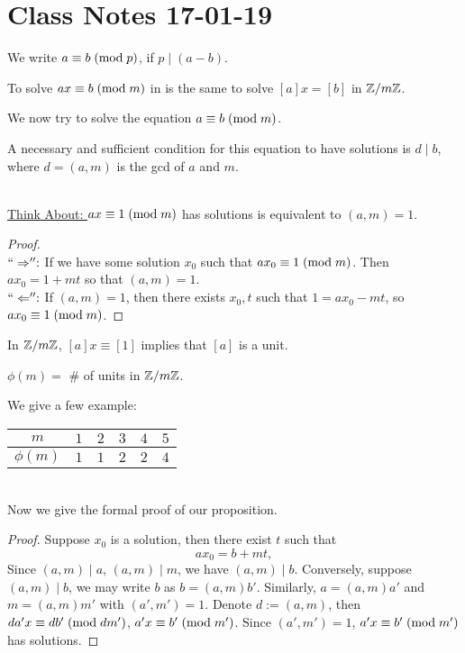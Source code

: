 \section{Class Notes 17-01-19}
\begin{definition}
We write $a\equiv b\;(\mbox{mod}{\;p})$, if $p\mid (a-b)$.
\end{definition}
\begin{remark}
To solve $ax\equiv b\;(\mbox{mod}{\;m})$ in \Z{} is the same to solve $[a]x=[b]$ in $\mathbb{Z}/m\mathbb{Z}$.
\end{remark}
We now try to solve the equation $a\equiv b\;(\mbox{mod}{\;m})$.
\begin{proposition}
A necessary and sufficient condition for this equation to have solutions is $d\mid b$, where $d=(a,m)$ is the gcd of $a$ and $m$.
\end{proposition}
\mbox{}\\\underline{Think About: }
$ax\equiv 1\;(\mbox{mod}{\;m})$ has solutions is equivalent to $(a,m) = 1$.
\begin{proof}\mbox{}\\
$``\Rightarrow'':$ If we have some solution $x_0$ such that $ax_0\equiv 1\;(\mbox{mod}{\;m})$. Then $ax_0=1+mt$ so that $(a,m)= 1$.\\
$``\Leftarrow'': $ If $(a,m) = 1$, then there exists $x_0, t$ such that $1=ax_0-mt$, so $ax_0\equiv 1\;(\mbox{mod}{\;m})$.
\end{proof}
\begin{remark}
In $\mathbb{Z}/m\mathbb{Z}$, $[a]x\equiv[1]$ implies that $[a]$ is a unit. 
\end{remark}
\begin{definition}
$\phi(m) =$ \# of units in $\mathbb{Z}/m\mathbb{Z}$. 
\end{definition}
We give a few example:\quad
\begin{tabular}{|c|c|c|c|c|c|}\hline
$m$ & $1$ & $2$ & $3$ & $4$ & $5$\\\hline
$\phi(m)$ & $1$ & $1$ & $2$ & $2$ & $4$\\\hline
\end{tabular}\\[6pt]
Now we give the formal proof of our proposition.
\begin{proof}
Suppose $x_0$ is a solution, then there exist $t$ such that $$ax_0=b+mt,$$ Since $(a,m)\mid a$, $(a,m)\mid m$, we have $(a,m)\mid b$. Conversely, suppose $(a,m)\mid b$, we may write $b$ as $b= (a,m)b'$. Similarly, $a=(a,m)a'$ and $m=(a,m)m'$ with $(a',m')=1$. Denote $d:=(a,m)$, then $da'x\equiv db'\;(\mbox{mod}{\;dm'})$, $a'x\equiv b'\;(\mbox{mod}{\;m'})$. Since $(a',m')=1$, $a'x\equiv b'\;(\mbox{mod}{\;m'})$ has solutions.
\end{proof}
